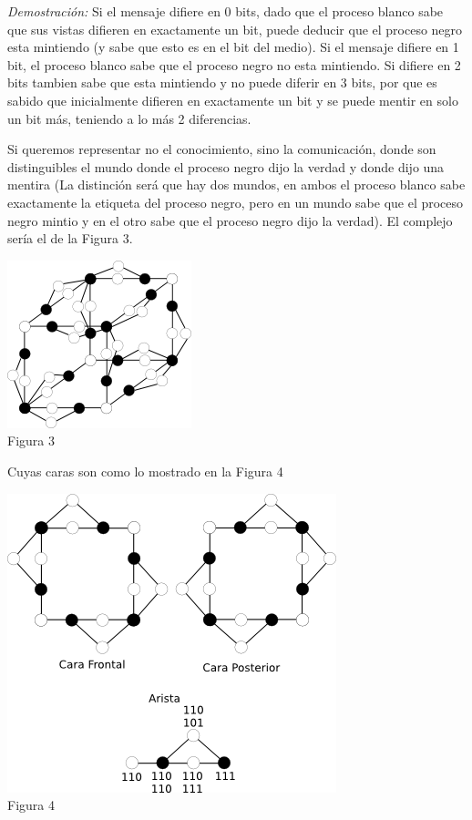 \documentclass{article}
\begin{document}
\begin{enumerate}
\begin{enumerate}
\emph{Demostración:} Si el mensaje difiere en 0 bits, dado que el proceso blanco sabe que sus vistas difieren en exactamente un bit, puede deducir que el proceso negro esta mintiendo (y sabe que esto es en el bit del medio). Si el mensaje difiere en 1 bit, el proceso blanco sabe que el proceso negro no esta mintiendo.  Si difiere en 2 bits tambien sabe que esta mintiendo y no puede diferir en 3 bits, por que es sabido que inicialmente difieren en exactamente un bit y se puede mentir en solo un bit más, teniendo a lo más 2 diferencias.

Si queremos representar no el conocimiento, sino la comunicación, donde son distinguibles el mundo donde el proceso negro dijo la verdad y donde dijo una mentira (La distinción será que hay dos mundos, en ambos el proceso blanco sabe exactamente la etiqueta del proceso negro, pero en un mundo sabe que el proceso negro mintio y en el otro sabe que el proceso negro dijo la verdad). El complejo sería el de la Figura 3.

\begin{center}
  \includegraphics{cubo3_1_1.png}\\
  Figura 3
\end{center}

Cuyas caras son como lo mostrado en la Figura 4

\begin{center}
  \includegraphics{cubo3_2.png}\\
  Figura 4
\end{center}


\end{enumerate}
\end{enumerate}
\end{document}
